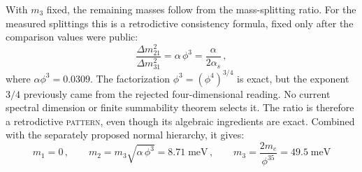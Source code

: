 \documentclass[12pt,a4paper]{article}
\theoremstyle{definition}
\begin{document}
With $m_3$ fixed, the remaining masses follow from the mass-splitting ratio.
For the measured splittings this is a retrodictive consistency formula,
fixed only after the comparison values were public:
\begin{equation}
\frac{\Delta m^2_{21}}{\Delta m^2_{31}} = \alpha\,\phi^3 = \frac{\alpha}{2\alpha_s}\,,
\label{eq:dm_ratio}
\end{equation}
where $\alpha\phi^3=0.0309$.  The factorization
$\phi^3=(\phi^4)^{3/4}$ is exact, but the exponent $3/4$ previously came from
the rejected four-dimensional reading.  No current spectral dimension or
finite summability theorem selects it.  The ratio is therefore a
retrodictive \textsc{pattern}, even though its algebraic ingredients are exact.
Combined with the separately proposed normal hierarchy, it gives:
\begin{equation}
\boxed{m_1 = 0\,,\qquad m_2 = m_3\sqrt{\alpha\,\phi^3} = 8.71\;\text{meV}\,,\qquad m_3 = \frac{2m_e}{\phi^{35}} = 49.5\;\text{meV}}
\label{eq:nu_spectrum}
\end{equation}
\end{document}
